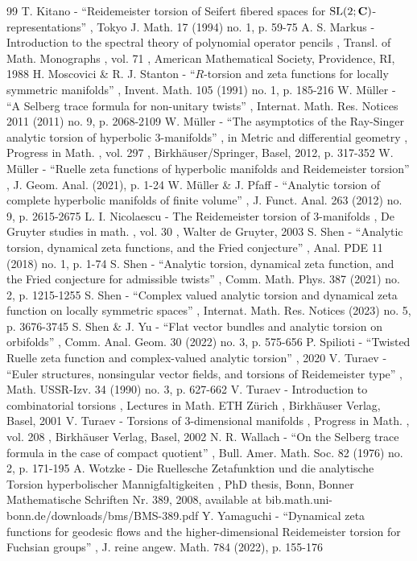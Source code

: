 \begin{thebibliography}{99}
 T. Kitano - “Reidemeister torsion of Seifert fibered spaces for ${\rm SL}(2;{\bf C})$-representations” , Tokyo J. Math. 17 (1994) no. 1, p. 59-75
 A. S. Markus - Introduction to the spectral theory of polynomial operator pencils , Transl. of Math. Monographs , vol. 71 , American Mathematical Society, Providence, RI, 1988
 H. Moscovici \& R. J. Stanton - “$R$-torsion and zeta functions for locally symmetric manifolds” , Invent. Math. 105 (1991) no. 1, p. 185-216
 W. Müller - “A Selberg trace formula for non-unitary twists” , Internat. Math. Res. Notices 2011 (2011) no. 9, p. 2068-2109
 W. Müller - “The asymptotics of the Ray-Singer analytic torsion of hyperbolic 3-manifolds” , in Metric and differential geometry , Progress in Math. , vol. 297 , Birkhäuser/Springer, Basel, 2012, p. 317-352
 W. Müller - “Ruelle zeta functions of hyperbolic manifolds and Reidemeister torsion” , J. Geom. Anal. (2021), p. 1-24
 W. Müller \& J. Pfaff - “Analytic torsion of complete hyperbolic manifolds of finite volume” , J. Funct. Anal. 263 (2012) no. 9, p. 2615-2675
 L. I. Nicolaescu - The Reidemeister torsion of 3-manifolds , De Gruyter studies in math. , vol. 30 , Walter de Gruyter, 2003
 S. Shen - “Analytic torsion, dynamical zeta functions, and the Fried conjecture” , Anal. PDE 11 (2018) no. 1, p. 1-74
 S. Shen - “Analytic torsion, dynamical zeta function, and the Fried conjecture for admissible twists” , Comm. Math. Phys. 387 (2021) no. 2, p. 1215-1255
 S. Shen - “Complex valued analytic torsion and dynamical zeta function on locally symmetric spaces” , Internat. Math. Res. Notices (2023) no. 5, p. 3676-3745
 S. Shen \& J. Yu - “Flat vector bundles and analytic torsion on orbifolds” , Comm. Anal. Geom. 30 (2022) no. 3, p. 575-656
 P. Spilioti - “Twisted Ruelle zeta function and complex-valued analytic torsion” , 2020
 V. Turaev - “Euler structures, nonsingular vector fields, and torsions of Reidemeister type” , Math. USSR-Izv. 34 (1990) no. 3, p. 627-662
 V. Turaev - Introduction to combinatorial torsions , Lectures in Math. ETH Zürich , Birkhäuser Verlag, Basel, 2001
 V. Turaev - Torsions of $3$-dimensional manifolds , Progress in Math. , vol. 208 , Birkhäuser Verlag, Basel, 2002
 N. R. Wallach - “On the Selberg trace formula in the case of compact quotient” , Bull. Amer. Math. Soc. 82 (1976) no. 2, p. 171-195
 A. Wotzke - Die Ruellesche Zetafunktion und die analytische Torsion hyperbolischer Mannigfaltigkeiten , PhD thesis, Bonn, Bonner Mathematische Schriften Nr. 389, 2008, available at bib.math.uni-bonn.de/downloads/bms/BMS-389.pdf
 Y. Yamaguchi - “Dynamical zeta functions for geodesic flows and the higher-dimensional Reidemeister torsion for Fuchsian groups” , J. reine angew. Math. 784 (2022), p. 155-176
\end{thebibliography}

